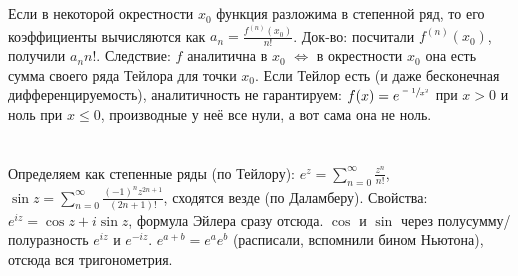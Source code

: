 \section{} %
Если в некоторой окрестности $x_0$ функция разложима в степенной ряд, то его коэффициенты вычисляются как $a_n=\frac{f^{(n)}(x_0)}{n!}$.
Док-во: посчитали $f^{(n)}(x_0)$, получили $a_nn!$.
Следствие: $f$ аналитична в $x_0$ $\iff$ в окрестности $x_0$ она есть сумма своего ряда Тейлора для точки $x_0$.
Если Тейлор есть (и даже бесконечная дифференцируемость), аналитичность не гарантируем: $f(x)=e^{\sfrac{-1}{x^2}}$ при $x>0$ и ноль при $x \le 0$, производные у неё все нули, а вот сама она не ноль.

\section{} %
Определяем как степенные ряды (по Тейлору): $e^z = \sum_{n=0}^\infty \frac{z^n}{n!}$,
$\sin z = \sum_{n=0}^\infty \frac{(-1)^nz^{2n+1}}{(2n+1)!}$, сходятся везде (по Даламберу).
Свойства: $e^{iz}=\cos z + i \sin z$, формула Эйлера сразу отсюда.
$\cos$ и $\sin$ через полусумму/полуразность $e^{iz}$ и $e^{-iz}$.
$e^{a+b}=e^ae^b$ (расписали, вспомнили бином Ньютона), отсюда вся тригонометрия.

\section{} %
\TODO

\section{} %
\TODO
